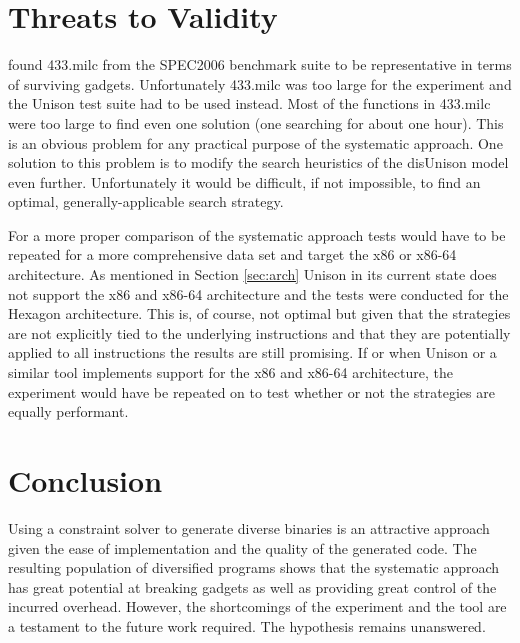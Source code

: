 \section{Threats to Validity}

\textcite{large-scale-automated} found 433.milc from the SPEC2006 benchmark suite to be
representative in terms of surviving gadgets. Unfortunately 433.milc was too large for the
experiment and the Unison test suite had to be used instead. Most of the functions in
433.milc were too large to find even one solution (one searching for about one hour).
This is an obvious problem for any practical purpose of the systematic approach. One
solution to this problem is to modify the search heuristics of the disUnison model even
further. Unfortunately it would be difficult, if not impossible, to find an optimal,
generally-applicable search strategy.

For a more proper comparison of the systematic approach tests would have to be repeated for
a more comprehensive data set and target the x86 or x86-64 architecture. As mentioned in
Section \ref{sec:arch} Unison in its current state does not support the x86 and x86-64
architecture and the tests were conducted for the Hexagon architecture. This is, of course,
not optimal but given that the strategies are not explicitly tied to the underlying
instructions and that they are potentially applied to all instructions the results are
still promising. If or when Unison or a similar tool implements support for the x86 and
x86-64 architecture, the experiment would have be repeated on to test whether or not the
strategies are equally performant.

\section{Conclusion}

Using a constraint solver to generate diverse binaries is an attractive approach given
the ease of implementation and the quality of the generated code. The resulting population
of diversified programs shows that the systematic approach has great potential at breaking
gadgets as well as providing great control of the incurred overhead. However, the
shortcomings of the experiment and the tool are a testament to the future work required.
The hypothesis remains unanswered.
